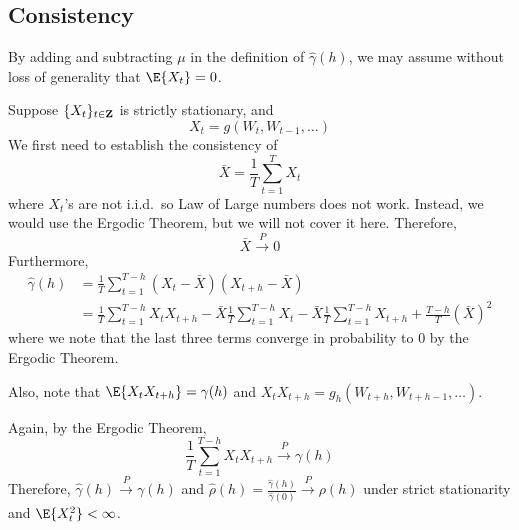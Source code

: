 \subsection*{Consistency}
By adding and subtracting $ \mu $ in the definition
of $ \hat{\gamma}(h) $, we may assume without loss of generality that $ \E{X_t}=0 $.

Suppose $ \{X_t\}_{t\in\mathbf{Z}} $ is strictly stationary, and
\[ X_t=g(W_t,W_{t-1},\ldots) \]
We first need to establish the consistency of
\[ \bar{X}=\frac{1}{T} \sum_{t=1}^{T} X_t \]
where $ X_t $'s are not i.i.d.\ so Law of Large numbers
does not work. Instead, we would use the Ergodic Theorem, but
we will not cover it here. Therefore,
\[ \bar{X}\stackrel{P}{\to}0 \]
Furthermore,
\begin{align*}
    \hat{\gamma}(h)
     & =\frac{1}{T} \sum_{t=1}^{T-h} (X_t-\bar{X})(X_{t+h}-\bar{X}) \\
     & =\frac{1}{T} \sum_{t=1}^{T-h} X_t X_{t+h}-
    \bar{X}\frac{1}{T} \sum_{t=1}^{T-h} X_t -\bar{X}\frac{1}{T} \sum_{t=1}^{T-h} X_{t+h}+
    \frac{T-h}{T} (\bar{X})^2
\end{align*}
where we note that the last three terms converge in probability to 0 by the Ergodic Theorem.

Also, note that $ \E{X_t X_{t+h}}=\gamma(h) $ and
$ X_{t}X_{t+h}=g_h(W_{t+h},W_{t+h-1},\ldots) $.

Again, by the Ergodic Theorem,
\[ \frac{1}{T} \sum_{t=1}^{T-h} X_t X_{t+h}\stackrel{P}{\to}\gamma(h) \]
Therefore, $ \hat{\gamma}(h)\stackrel{P}{\to}\gamma(h) $
and $ \displaystyle \hat{\rho}(h)=\frac{\hat{\gamma}(h)}{\hat{\gamma}(0)}\stackrel{P}{\to}\rho(h) $
under strict stationarity and $ \E{X_t^2}<\infty $.

